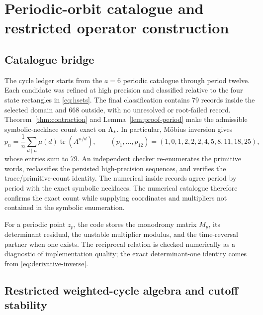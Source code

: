 \section{Periodic-orbit catalogue and restricted operator construction}
\label{sec:orbits}

\subsection{Catalogue bridge}

The cycle ledger starts from the $a=6$ periodic catalogue through period twelve.
Each candidate was refined at high precision and classified relative to the
four state rectangles in \eqref{eq:hsets}.  The final classification contains
79 records inside the selected domain and 668 outside, with no unresolved or
root-failed record.  Theorem~\ref{thm:contraction} and
Lemma~\ref{lem:proof-period} make the admissible symbolic-necklace count exact
on $\Lambda_*$.  In particular, M\"obius inversion gives
\begin{equation}
 p_n=\frac1n\sum_{d\mid n}\mu(d)\operatorname{tr}\!\left(A^{n/d}\right),
 \qquad
 (p_1,\ldots,p_{12})=(1,0,1,2,2,2,4,5,8,11,18,25),
 \label{eq:primitive-counts}
\end{equation}
whose entries sum to 79.  An
independent checker re-enumerates the primitive words, reclassifies the
persisted high-precision sequences, and verifies the trace/primitive-count
identity.  The numerical inside records agree period by period with the exact
symbolic necklaces.  The numerical catalogue therefore confirms the exact
count while supplying coordinates and multipliers not contained in the
symbolic enumeration.

For a periodic point $z_p$, the code stores the monodromy matrix $M_p$, its
determinant residual, the unstable multiplier modulus, and the time-reversal
partner when one exists.  The reciprocal relation is checked numerically as a
diagnostic of implementation quality; the exact determinant-one identity comes
from \eqref{eq:derivative-inverse}.

\subsection{Restricted weighted-cycle algebra and cutoff stability}

